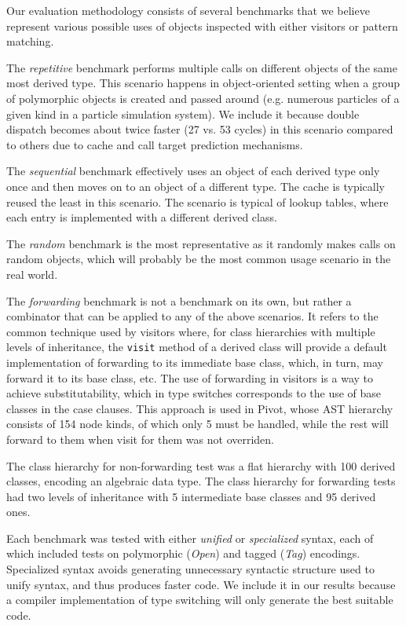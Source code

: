 \documentclass[preprint]{sigplanconf}
\makeatletter
\DeclareRobustCommand{\code}[1]{{\lstinline[breaklines=false,escapechar=@]{#1}}}
\makeatother
\begin{document}
Our evaluation methodology consists of several benchmarks that we believe 
represent various possible uses of objects inspected with either visitors or 
pattern matching.

The \emph{repetitive} benchmark performs multiple calls on different objects of the 
same most derived type. This scenario happens in object-oriented setting when a 
group of polymorphic objects is created and passed around (e.g. numerous 
particles of a given kind in a particle simulation system). We include it 
because double dispatch becomes about twice faster (27 vs. 53 cycles) in this 
scenario compared to others due to cache and call target prediction mechanisms. 

The \emph{sequential} benchmark effectively uses an object of each derived type only 
once and then moves on to an object of a different type. The cache is typically 
reused the least in this scenario. The scenario is typical of lookup tables, 
where each entry is implemented with a different derived class.

The \emph{random} benchmark is the most representative as it randomly makes calls on 
random objects, which will probably be the most common usage scenario in the 
real world.

The \emph{forwarding} benchmark is not a benchmark on its own, but rather a 
combinator that can be applied to any of the above scenarios. It refers to the 
common technique used by visitors where, for class hierarchies with multiple 
levels of inheritance, the \code{visit} method of a derived class will provide a 
default implementation of forwarding to its immediate base class, which, in turn, 
may forward it to its base class, etc. The use of forwarding in visitors is a 
way to achieve substitutability, which in type switches corresponds to the use 
of base classes in the case clauses.
This approach is used in Pivot, whose AST 
hierarchy consists of 154 node kinds, of which only 5 must be handled, while the 
rest will forward to them when visit for them was not overriden.

The class hierarchy for non-forwarding test was a flat hierarchy with 100 
derived classes, encoding an algebraic data type. The class hierarchy for 
forwarding tests had two levels of inheritance with 5 intermediate base classes 
and 95 derived ones. 

Each benchmark was tested with either \emph{unified} or \emph{specialized} 
syntax, each of which included tests on polymorphic (\emph{Open}) and tagged 
(\emph{Tag}) encodings. Specialized syntax avoids generating unnecessary 
syntactic structure used to unify syntax, and thus produces faster code. We 
include it in our results because a compiler implementation of type switching 
will only generate the best suitable code.
\end{document}
